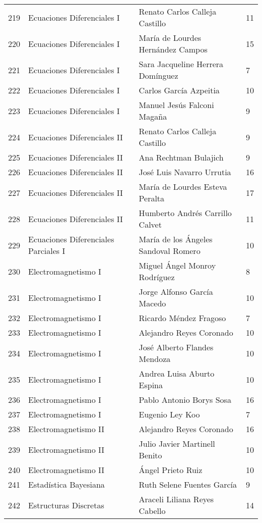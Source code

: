 \begin{table}[ht]
\begin{tabular}{rlll}
  219 & Ecuaciones Diferenciales I & Renato Carlos Calleja Castillo & 11 \\ 
  220 & Ecuaciones Diferenciales I & María de Lourdes Hernández Campos & 15 \\ 
  221 & Ecuaciones Diferenciales I & Sara Jacqueline Herrera Domínguez & 7 \\ 
  222 & Ecuaciones Diferenciales I & Carlos García Azpeitia & 10 \\ 
  223 & Ecuaciones Diferenciales I & Manuel Jesús Falconi Magaña & 9 \\ 
  224 & Ecuaciones Diferenciales II & Renato Carlos Calleja Castillo & 9 \\ 
  225 & Ecuaciones Diferenciales II & Ana Rechtman Bulajich & 9 \\ 
  226 & Ecuaciones Diferenciales II & José Luis Navarro Urrutia & 16 \\ 
  227 & Ecuaciones Diferenciales II & María de Lourdes Esteva Peralta & 17 \\ 
  228 & Ecuaciones Diferenciales II & Humberto Andrés Carrillo Calvet & 11 \\ 
  229 & Ecuaciones Diferenciales Parciales I & María de los Ángeles Sandoval Romero & 10 \\ 
  230 & Electromagnetismo I & Miguel Ángel Monroy Rodríguez & 8 \\ 
  231 & Electromagnetismo I & Jorge Alfonso García Macedo & 10 \\ 
  232 & Electromagnetismo I & Ricardo Méndez Fragoso & 7 \\ 
  233 & Electromagnetismo I & Alejandro Reyes Coronado & 10 \\ 
  234 & Electromagnetismo I & José Alberto Flandes Mendoza & 10 \\ 
  235 & Electromagnetismo I & Andrea Luisa Aburto Espina & 10 \\ 
  236 & Electromagnetismo I & Pablo Antonio Borys Sosa & 16 \\ 
  237 & Electromagnetismo I & Eugenio Ley Koo & 7 \\ 
  238 & Electromagnetismo II & Alejandro Reyes Coronado & 16 \\ 
  239 & Electromagnetismo II & Julio Javier Martinell Benito & 10 \\ 
  240 & Electromagnetismo II & Ángel Prieto Ruiz & 10 \\ 
  241 & Estadística Bayesiana & Ruth Selene Fuentes García & 9 \\ 
  242 & Estructuras Discretas & Araceli Liliana Reyes Cabello & 14 \\ 

\end{tabular}
\end{table}

